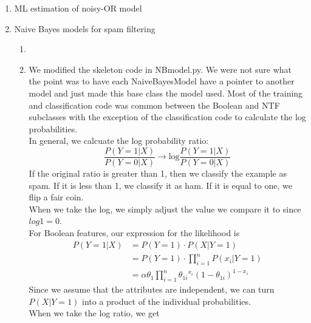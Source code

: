 \documentclass{article}
\begin{document}
\begin{enumerate}
    \item ML estimation of noisy-OR model %
    
    \item Naive Bayes models for spam filtering %
        \begin{enumerate}
            \item %
            \item %
                We modified the skeleton code in NBmodel.py. We were not
                sure what the point was to have each NaiveBayesModel have
                a pointer to another model and just made this base class the
                model used. Most of the training and classification code was
                common between the Boolean and NTF subclasses with the
                exception of the classification code to calculate the log
                probabilities. \\
                In general, we calcuate the log probability ratio:
                \begin{equation*}
                    \frac{P(Y=1|X)}{P(Y=0|X)} \rightarrow
                    \text{log}\frac{P(Y=1|X)}{P(Y=0|X)} 
                \end{equation*}
                If the original ratio is greater than 1, then we classify
                the example as spam. If it is less than 1, we classify it 
                as ham. If it is equal to one, we flip a fair coin. \\
                When we take the log, we simply adjust the value we compare
                it to since \(log1=0\). \\
                For Boolean features, our expression for the likelihood is
                \begin{align*}
                    P(Y=1|X)
                        &= P(Y=1) \cdot P(X|Y=1) \\
                        &= P(Y=1) \cdot \prod\limits_{i=1}^n P(x_i|Y=1) \\
                        &= \alpha \theta_1 \prod\limits_{i=1}^n 
                            {\theta_{1i}}^{x_i}(1-\theta_{1i})^{1-x_i}
                \end{align*}
                Since we assume that the attributes are independent, we can
                turn \(P(X|Y=1)\) into a product of the individual
                probabilities. \\
                When we take the log ratio, we get
                \begin{align*}

\end{align*}
\end{enumerate}
\end{enumerate}
\end{document}
